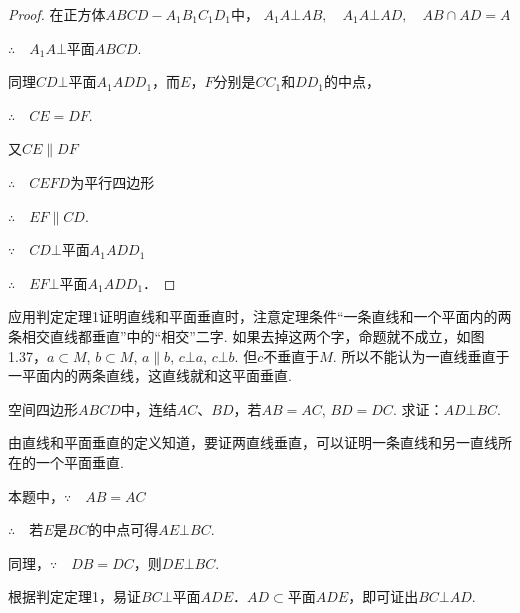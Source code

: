\begin{proof}
在正方体$ABCD-A_1B_1C_1D_1$中，
$A_1A\bot AB,\quad A_1A\bot AD,\quad AB\cap AD=A$

$\therefore\quad A_1A\bot $平面$ABCD$.

同理$CD\bot $平面$A_1ADD_1$，而$E$，$F$分别是$CC_1$和$DD_1$的中点，


\noindent
\begin{minipage}{.45\textwidth}\CTEXindent
$\therefore\quad CE=DF$.

又$CE\parallel DF$

$\therefore\quad CEFD$为平行四边形

$\therefore\quad EF\parallel CD$.

$\because\quad CD\bot $平面$A_1ADD_1$

$\therefore\quad EF\bot $平面$A_1ADD_1$．
\end{minipage}
\hfill
\begin{minipage}{.45\textwidth}
\centering
{}
\end{minipage}
\end{proof}
 
\begin{remark}
应用判定定理1证明直线和平面垂直时，注意定理条件“一条直线和一个平面内的两条相交直线都垂直”中的“相交”二字. 如果去掉这两个字，命题就不成立，如图1.37，$a\subset M$, $b\subset M$, $a\parallel b$, $c\bot a$, $c\bot b$. 但$c$不垂直于$M$. 所以不能认为一直线垂直于一平面内的两条直线，这直线就和这平面垂直.
\end{remark}


\begin{example}
    空间四边形$ABCD$中，连结$AC$、$BD$，若$AB=AC$, $BD=DC$. 求证：$AD\bot BC$.
\end{example}

\begin{analyze}
由直线和平面垂直的定义知道，要证两直线垂直，可以证明一条直线和另一直线所在的一个平面垂直.

本题中，$\because\quad AB=AC$

$\therefore\quad $若$E$是$BC$的中点可得$AE\bot BC$. 

同理，$\because\quad DB=DC$，则$DE\bot BC$.

根据判定定理1，易证$BC\bot $平面$ADE$．$AD\subset $平面$ADE$，即可证出$BC\bot AD$.
\end{analyze}

